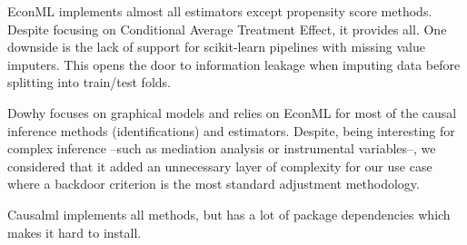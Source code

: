 \documentclass[10pt,letterpaper]{article}
\begin{document}
EconML \cite{battocchi2019econml} implements almost all estimators except propensity score methods. Despite
focusing on Conditional Average Treatment Effect, it provides all. One downside
is the lack of support for scikit-learn pipelines with missing value imputers.
This opens the door to information leakage when imputing data before splitting
into train/test folds.

Dowhy \cite{sharma2020dowhy} focuses on graphical models and relies on EconML for most of the causal
inference methods (identifications) and estimators. Despite, being interesting
for complex inference --such as mediation analysis or instrumental variables--,
we considered that it added an unnecessary layer of complexity for our use case
where a backdoor criterion is the most standard adjustment methodology.

Causalml implements all methods, but has a lot of package dependencies
which makes it hard to install.
\end{document}
